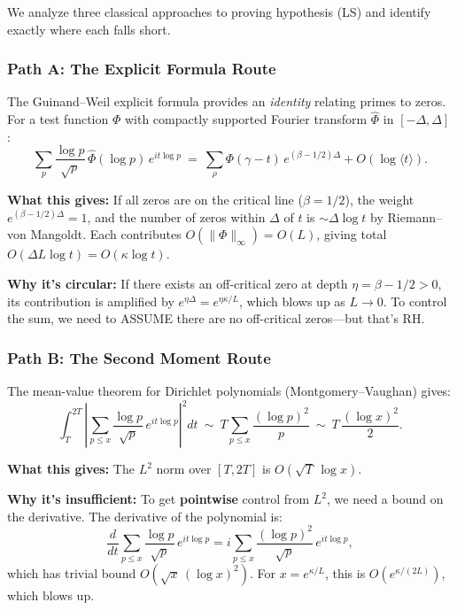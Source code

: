 \documentclass[11pt]{article}
\theoremstyle{definition}
\theoremstyle{remark}
\theoremstyle{definition}
\begin{document}
We analyze three classical approaches to proving hypothesis \textup{(LS)} and identify exactly where each falls short.

\subsubsection*{Path A: The Explicit Formula Route}

The Guinand--Weil explicit formula provides an \emph{identity} relating primes to zeros. For a test function $\Phi$ with compactly supported Fourier transform $\widehat{\Phi}$ in $[-\Delta, \Delta]$:
\begin{equation}\label{eq:guinand-weil}
  \sum_p \frac{\log p}{\sqrt{p}}\,\widehat{\Phi}(\log p)\,e^{it\log p} 
  \ =\ \sum_\rho \Phi(\gamma - t)\,e^{(\beta-1/2)\Delta} + O(\log\langle t\rangle).
\end{equation}

\textbf{What this gives:} If all zeros are on the critical line ($\beta = 1/2$), the weight $e^{(\beta-1/2)\Delta} = 1$, and the number of zeros within $\Delta$ of $t$ is $\sim \Delta\log t$ by Riemann--von Mangoldt. Each contributes $O(\|\Phi\|_\infty) = O(L)$, giving total $O(\Delta L \log t) = O(\kappa\log t)$.

\textbf{Why it's circular:} If there exists an off-critical zero at depth $\eta = \beta - 1/2 > 0$, its contribution is amplified by $e^{\eta\Delta} = e^{\eta\kappa/L}$, which blows up as $L \to 0$. To control the sum, we need to ASSUME there are no off-critical zeros---but that's RH.

\subsubsection*{Path B: The Second Moment Route}

The mean-value theorem for Dirichlet polynomials (Montgomery--Vaughan) gives:
\[
  \int_T^{2T} \left|\sum_{p \le x} \frac{\log p}{\sqrt{p}}\,e^{it\log p}\right|^2 dt 
  \ \sim\ T\sum_{p \le x} \frac{(\log p)^2}{p} \ \sim\ T\,\frac{(\log x)^2}{2}.
\]

\textbf{What this gives:} The $L^2$ norm over $[T, 2T]$ is $O(\sqrt{T}\,\log x)$.

\textbf{Why it's insufficient:} To get \textbf{pointwise} control from $L^2$, we need a bound on the derivative. The derivative of the polynomial is:
\[
  \frac{d}{dt}\sum_{p \le x} \frac{\log p}{\sqrt{p}}\,e^{it\log p} = i\sum_{p \le x} \frac{(\log p)^2}{\sqrt{p}}\,e^{it\log p},
\]
which has trivial bound $O(\sqrt{x}\,(\log x)^2)$. For $x = e^{\kappa/L}$, this is $O(e^{\kappa/(2L)})$, which blows up.
\end{document}
